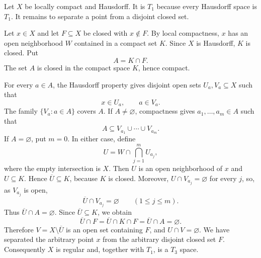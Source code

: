 \documentclass{article}
\begin{document}
\begin{solution}
  Let $X$ be locally compact and Hausdorff. It is $T_1$ because every
  Hausdorff space is $T_1$. It remains to separate a point from a disjoint
  closed set.

  Let $x\in X$ and let $F\subseteq X$ be closed with $x\notin F$.
  By local compactness, $x$ has an open neighborhood $W$ contained in a
  compact set $K$. Since $X$ is Hausdorff, $K$ is closed. Put
  \[
    A=K\cap F.
  \]
  The set $A$ is closed in the compact space $K$, hence compact.

  For every $a\in A$, the Hausdorff property gives disjoint open sets
  $U_a,V_a\subseteq X$ such that
  \[
    x\in U_a,\qquad a\in V_a.
  \]
  The family $\{V_a:a\in A\}$ covers $A$. If $A\ne\varnothing$,
  compactness gives $a_1,\ldots,a_m\in A$ such that
  \[
    A\subseteq V_{a_1}\cup\cdots\cup V_{a_m}.
  \]
  If $A=\varnothing$, put $m=0$. In either case, define
  \[
    U=W\cap\bigcap_{j=1}^m U_{a_j},
  \]
  where the empty intersection is $X$.
  Then $U$ is an open neighborhood of $x$ and $U\subseteq K$. Hence
  $\overline{U}\subseteq K$, because $K$ is closed. Moreover,
  $U\cap V_{a_j}=\varnothing$ for every $j$, so, as $V_{a_j}$ is open,
  \[
    \overline{U}\cap V_{a_j}=\varnothing\qquad (1\le j\le m).
  \]
  Thus $\overline{U}\cap A=\varnothing$. Since $\overline{U}\subseteq K$,
  we obtain
  \[
    \overline{U}\cap F
    =\overline{U}\cap K\cap F
    =\overline{U}\cap A
    =\varnothing.
  \]
  Therefore $V=X\setminus\overline{U}$ is an open set containing $F$, and
  $U\cap V=\varnothing$. We have separated the arbitrary point $x$ from
  the arbitrary disjoint closed set $F$. Consequently $X$ is regular and,
  together with $T_1$, is a $T_3$ space.
\end{solution}
\end{document}

